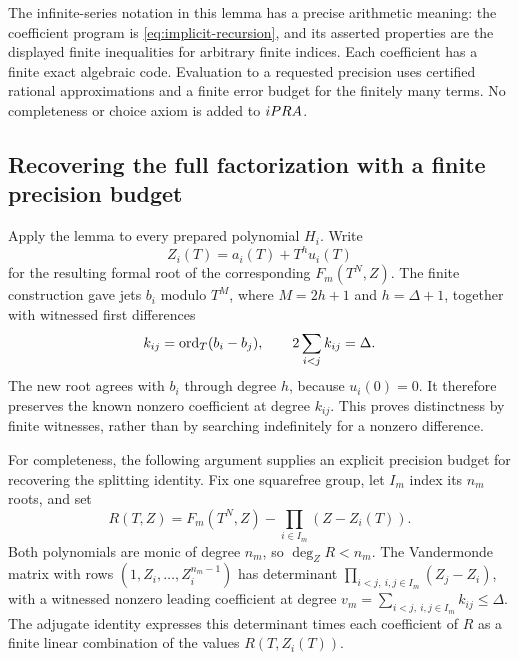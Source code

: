 The infinite-series notation in this lemma has a precise arithmetic
meaning: the coefficient program is \eqref{eq:implicit-recursion}, and
its asserted properties are the displayed finite inequalities for arbitrary
finite indices. Each coefficient has a finite exact algebraic code.
Evaluation to a requested precision uses certified rational approximations
and a finite error budget for the finitely many terms. No completeness or
choice axiom is added to $iPRA$.

\subsection{Recovering the full factorization with a finite precision budget}

Apply the lemma to every prepared polynomial $H_i$. Write
\[
 Z_i(T)=a_i(T)+T^h u_i(T)
\]
for the resulting formal root of the corresponding
$F_m(T^N,Z)$. The finite construction gave jets $b_i$ modulo $T^M$,
where $M=2h+1$ and $h=\Delta+1$, together with witnessed first
differences
\[
 k_{ij}=\operatorname{ord}_T(b_i-b_j),\qquad
 2\sum_{i<j}k_{ij}=\Delta.
\]
The new root agrees with $b_i$ through degree $h$, because $u_i(0)=0$.
It therefore preserves the known nonzero coefficient at degree $k_{ij}$.
This proves distinctness by finite witnesses, rather than by searching
indefinitely for a nonzero difference.

For completeness, the following argument supplies an explicit precision
budget for recovering the splitting identity. Fix one squarefree group,
let $I_m$ index its $n_m$ roots, and set
\[
 R(T,Z)=F_m(T^N,Z)-\prod_{i\in I_m}(Z-Z_i(T)).
\]
Both polynomials are monic of degree $n_m$, so $\deg_ZR<n_m$.
The Vandermonde matrix with rows
$(1,Z_i,\ldots,Z_i^{n_m-1})$ has determinant
$\prod_{i<j,\ i,j\in I_m}(Z_j-Z_i)$, with a witnessed nonzero
leading coefficient at degree
$v_m=\sum_{i<j,\ i,j\in I_m}k_{ij}\le\Delta$.
The adjugate identity expresses this determinant times each coefficient
of $R$ as a finite linear combination of the values $R(T,Z_i(T))$.

